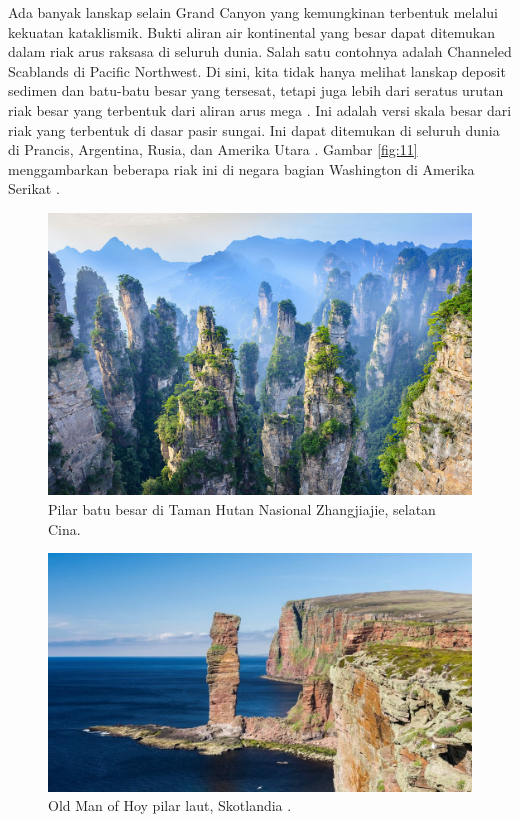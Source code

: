 \documentclass[10pt,twocolumn,letterpaper]{article}
\begin{document}
Ada banyak lanskap selain Grand Canyon yang kemungkinan terbentuk melalui kekuatan kataklismik. Bukti aliran air kontinental yang besar dapat ditemukan dalam riak arus raksasa di seluruh dunia. Salah satu contohnya adalah Channeled Scablands di Pacific Northwest. Di sini, kita tidak hanya melihat lanskap deposit sedimen dan batu-batu besar yang tersesat, tetapi juga lebih dari seratus urutan riak besar yang terbentuk dari aliran arus mega \cite{78,79}. Ini adalah versi skala besar dari riak yang terbentuk di dasar pasir sungai. Ini dapat ditemukan di seluruh dunia di Prancis, Argentina, Rusia, dan Amerika Utara \cite{81}. Gambar \ref{fig:11} menggambarkan beberapa riak ini di negara bagian Washington di Amerika Serikat \cite{80}.

\begin{figure}[b]
\begin{center}
   \includegraphics[width=1\linewidth]{zhangjiajie.jpg}
\end{center}
   \caption{Pilar batu besar di Taman Hutan Nasional Zhangjiajie, selatan Cina.}
\label{fig:12}
\label{fig:onecol}
\end{figure}

\begin{figure}[t]
\begin{center}
   \includegraphics[width=1\linewidth]{hoy.jpg}
\end{center}
   \caption{Old Man of Hoy pilar laut, Skotlandia \cite{83}.}
\label{fig:13}
\label{fig:onecol}
\end{figure}
\end{document}
